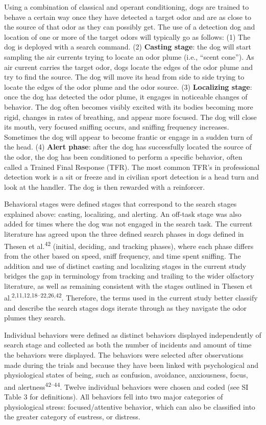\documentclass[
]{article}
\begin{document}
Using a combination of classical and operant conditioning, dogs are trained to behave a certain way once they have detected a target odor and are as close to the source of that odor as they can possibly get. The use of a detection dog and location of one or more of the target odors will typically go as follows: (1) The dog is deployed with a search command. (2) \textbf{Casting stage}: the dog will start sampling the air currents trying to locate an odor plume (i.e., ``scent cone''). As air current carries the target odor, dogs locate the edges of the odor plume and try to find the source. The dog will move its head from side to side trying to locate the edges of the odor plume and the odor source. (3) \textbf{Localizing stage}: once the dog has detected the odor plume, it engages in noticeable changes of behavior. The dog often becomes visibly excited with its bodies becoming more rigid, changes in rates of breathing, and appear more focused. The dog will close its mouth, very focused sniffing occurs, and sniffing frequency increases. Sometimes the dog will appear to become frantic or engage in a sudden turn of the head. (4) \textbf{Alert phase}: after the dog has successfully located the source of the odor, the dog has been conditioned to perform a specific behavior, often called a Trained Final Response (TFR). The most common TFR's in professional detection work is a sit or freeze and in civilian sport detection is a head turn and look at the handler. The dog is then rewarded with a reinforcer.

Behavioral stages were defined stages that correspond to the search stages explained above: casting, localizing, and alerting. An off-task stage was also added for times where the dog was not engaged in the search task. The current literature has agreed upon the three defined search phases in dogs defined in Thesen et al.\textsuperscript{42} (initial, deciding, and tracking phases), where each phase differs from the other based on speed, sniff frequency, and time spent sniffing. The addition and use of distinct casting and localizing stages in the current study bridges the gap in terminology from tracking and trailing to the wider olfactory literature, as well as remaining consistent with the stages outlined in Thesen et al.\textsuperscript{2,11,12,18--22,26,42}. Therefore, the terms used in the current study better classify and describe the search stages dogs iterate through as they navigate the odor plumes they search.

Individual behaviors were defined as distinct behaviors displayed independently of search stage and collected as both the number of incidents and amount of time the behaviors were displayed. The behaviors were selected after observations made during the trials and because they have been linked with psychological and physiological states of being, such as confusion, avoidance, anxiousness, focus, and alertness\textsuperscript{42--44}. Twelve individual behaviors were chosen and coded (see SI Table 3 for definitions). All behaviors fell into two major categories of physiological stress: focused/attentive behavior, which can also be classified into the greater category of eustress, or distress.
\end{document}
